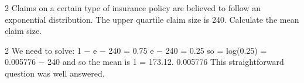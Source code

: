 \documentclass[a4paper,12pt]{article}
\begin{document}
2 Claims on a certain type of insurance policy are believed to follow an exponential
distribution. The upper quartile claim size is 240.
Calculate the mean claim size.



2
We need to solve:
1 − e − 240 \lambda = 0.75
e − 240 \lambda = 0.25
so
\lambda=
log(0.25)
= 0.005776
− 240
and so the mean is
1
= 173.12.
0.005776
This straightforward question was well answered.
\end{document}

